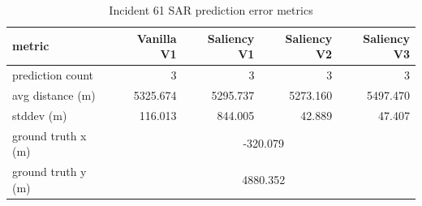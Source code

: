 \begin{table}[ht]
\centering
\caption{Incident 61 SAR prediction error metrics}
\label{tab:sar-incident-61}
\begin{tabular}{lrrrr}
\hline
metric & Vanilla V1 & Saliency V1 & Saliency V2 & Saliency V3 \\
\hline
prediction count & 3 & 3 & 3 & 3 \\
avg distance (m) & 5325.674 & 5295.737 & 5273.160 & 5497.470 \\
stddev (m) & 116.013 & 844.005 & 42.889 & 47.407 \\
ground truth x (m) & \multicolumn{4}{c}{-320.079} \\
ground truth y (m) & \multicolumn{4}{c}{4880.352} \\
\hline
\end{tabular}
\end{table}
